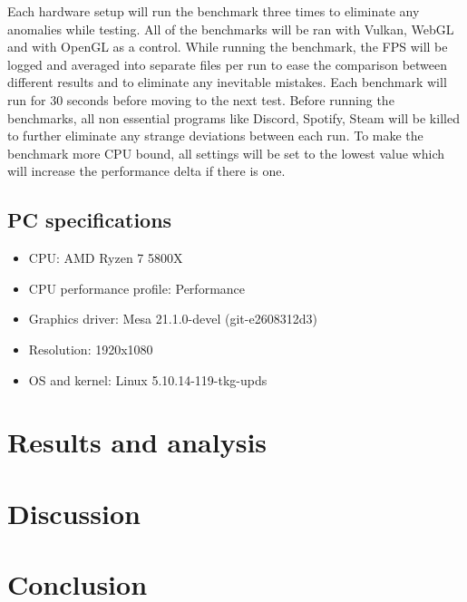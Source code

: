 \documentclass{article}
\begin{document}
Each hardware setup will run the benchmark three times to eliminate any anomalies while testing. All of the benchmarks will be ran with Vulkan, WebGL and with OpenGL as a control. While running the benchmark, the FPS will be logged and averaged into separate files per run to ease the comparison between different results and to eliminate any inevitable mistakes. Each benchmark will run for 30 seconds before moving to the next test. Before running the benchmarks, all non essential programs like Discord, Spotify, Steam will be killed to further eliminate any strange deviations between each run. To make the benchmark more CPU bound, all settings will be set to the lowest value which will increase the performance delta if there is one.

\subsection {PC specifications}
\begin{itemize}
    \item CPU: AMD Ryzen 7 5800X
    \item CPU performance profile: Performance
    \item Graphics driver: Mesa 21.1.0-devel (git-e2608312d3)
    \item Resolution: 1920x1080
    \item OS and kernel: Linux 5.10.14-119-tkg-upds
\end{itemize}


\section {Results and analysis}


\section {Discussion}


\section {Conclusion}



\printbibliography[heading=bibintoc,title={References}]
\end{document}
